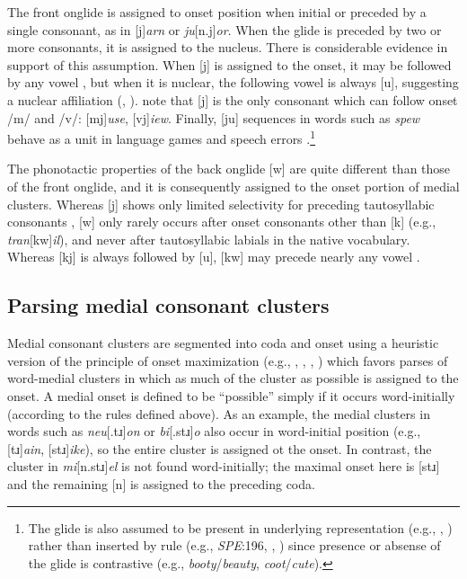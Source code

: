 \documentclass[12pt]{article}
\begin{document}
The front onglide is assigned to onset position when initial or preceded by a single consonant, as in [j]\emph{arn} or \emph{ju}[n.j]\emph{or}. When the glide is preceded by two or more consonants, it is assigned to the nucleus. There is considerable evidence in support of this assumption. When [j] is assigned to the onset, it may be followed by any vowel \citep[276]{Borowsky1986}, but when it is nuclear, the following vowel is always [u], suggesting a nuclear affiliation (\citealp[61f.]{Harris1994}, \citealp[232]{Hayes1980}). \citet[42]{Clements1983} note that [j] is the only consonant which can follow onset /m/ and /v/: [mj]\emph{use}, [vj]\emph{iew}. Finally, [ju] sequences in words such as \emph{spew} behave as a unit in language games \citep{Davis1995,Nevins2003} and speech errors \citep[130]{Shattuck-Hufnagel1986}.\footnote{The glide is also assumed to be present in underlying representation (e.g., \citealp{Anderson1988b}, \citealp[278]{Borowsky1986}) rather than inserted by rule (e.g., \emph{SPE}:196, \citealp[][89]{Halle1985a}, \citealp[][217]{McMahon1990}) since presence or absense of the glide is contrastive (e.g., \emph{booty}/\emph{beauty}, \emph{coot}/\emph{cute}).}

The phonotactic properties of the back onglide [w] are quite different than those of the front onglide, and it is consequently assigned to the onset portion of medial clusters. Whereas [j] shows only limited selectivity for preceding tautosyllabic consonants \citep{Kaye1996}, [w] only rarely occurs after onset consonants other than [k] (e.g., \emph{tran}[kw]\emph{il}), and never after tautosyllabic labials in the native vocabulary. Whereas [kj] is always followed by [u], [kw] may precede nearly any vowel \citep[161]{Davis1995}.

\subsection{Parsing medial consonant clusters}

Medial consonant clusters are segmented into coda and onset using a heuristic version of the principle of onset maximization (e.g., \citealp[42f.]{Kahn1976}, \citealp{Kurylowicz1948}, \citealp[75]{Pulgram1970}, \citealp[][358f.]{Selkirk1982b}) which favors parses of word-medial clusters in which as much of the cluster as possible is assigned to the onset. A medial onset is defined to be ``possible'' simply if it occurs word-initially (according to the rules defined above). As an example, the medial clusters in words such as \emph{neu}[.tɹ]\emph{on} or \emph{bi}[.stɹ]\emph{o} also occur in word-initial position (e.g., [tɹ]\emph{ain}, [stɹ]\emph{ike}), so the entire cluster is assigned ot the onset. In contrast, the cluster in \emph{mi}[n.stɹ]\emph{el} is not found word-initially; the maximal onset here is [stɹ] and the remaining [n] is assigned to the preceding coda.
\end{document}
